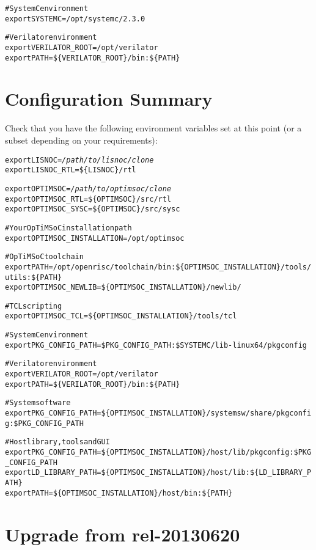\begin{alltt}
# SystemC environment
export SYSTEMC=/opt/systemc/2.3.0

# Verilator environment
export VERILATOR\_ROOT=/opt/verilator
export PATH=\$\{VERILATOR_ROOT\}/bin:\$\{PATH\}
\end{alltt}

\section{Configuration Summary}

Check that you have the following environment variables set at this
point (or a subset depending on your requirements):

\begin{alltt}
export LISNOC=\emph{/path/to/lisnoc/clone}
export LISNOC_RTL=\$\{LISNOC\}/rtl

export OPTIMSOC=\emph{/path/to/optimsoc/clone}
export OPTIMSOC_RTL=\$\{OPTIMSOC\}/src/rtl
export OPTIMSOC_SYSC=\$\{OPTIMSOC\}/src/sysc

# Your OpTiMSoC installation path
export OPTIMSOC_INSTALLATION=/opt/optimsoc

# OpTiMSoC toolchain
export PATH=/opt/openrisc/toolchain/bin:\$\{OPTIMSOC_INSTALLATION\}/tools/utils:\$\{PATH\}
export OPTIMSOC_NEWLIB=\$\{OPTIMSOC_INSTALLATION\}/newlib/

# TCL scripting
export OPTIMSOC_TCL=\$\{OPTIMSOC_INSTALLATION\}/tools/tcl

# SystemC environment
export PKG_CONFIG_PATH=\$PKG_CONFIG_PATH:\$SYSTEMC/lib-linux64/pkgconfig

# Verilator environment
export VERILATOR\_ROOT=/opt/verilator
export PATH=\$\{VERILATOR_ROOT\}/bin:\$\{PATH\}

# System software
export PKG_CONFIG_PATH=\$\{OPTIMSOC_INSTALLATION\}/systemsw/share/pkgconfig:\$PKG_CONFIG_PATH

# Host library, tools and GUI
export PKG_CONFIG_PATH=\$\{OPTIMSOC_INSTALLATION\}/host/lib/pkgconfig:\$PKG_CONFIG_PATH
export LD_LIBRARY_PATH=\$\{OPTIMSOC_INSTALLATION\}/host/lib:\$\{LD_LIBRARY_PATH\}
export PATH=\$\{OPTIMSOC_INSTALLATION\}/host/bin:\$\{PATH\}
\end{alltt}

\section{Upgrade from rel-20130620}

